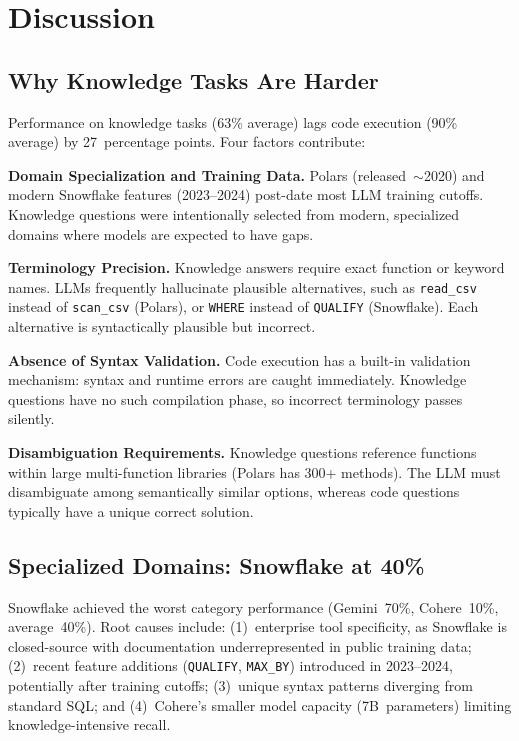\documentclass[conference]{IEEEtran}
\begin{document}
\section{Discussion}

\subsection{Why Knowledge Tasks Are Harder}

Performance on knowledge tasks (63\% average) lags code execution (90\% average) by 27~percentage points. Four factors contribute:

\textbf{Domain Specialization and Training Data.} Polars (released~$\sim$2020) and modern Snowflake features (2023--2024) post-date most LLM training cutoffs. Knowledge questions were intentionally selected from modern, specialized domains where models are expected to have gaps.

\textbf{Terminology Precision.} Knowledge answers require exact function or keyword names. LLMs frequently hallucinate plausible alternatives, such as \texttt{read\_csv} instead of \texttt{scan\_csv} (Polars), or \texttt{WHERE} instead of \texttt{QUALIFY} (Snowflake). Each alternative is syntactically plausible but incorrect.

\textbf{Absence of Syntax Validation.} Code execution has a built-in validation mechanism: syntax and runtime errors are caught immediately. Knowledge questions have no such compilation phase, so incorrect terminology passes silently.

\textbf{Disambiguation Requirements.} Knowledge questions reference functions within large multi-function libraries (Polars has 300+ methods). The LLM must disambiguate among semantically similar options, whereas code questions typically have a unique correct solution.

\subsection{Specialized Domains: Snowflake at 40\%}

Snowflake achieved the worst category performance (Gemini~70\%, Cohere~10\%, average~40\%). Root causes include: (1)~enterprise tool specificity, as Snowflake is closed-source with documentation underrepresented in public training data; (2)~recent feature additions (\texttt{QUALIFY}, \texttt{MAX\_BY}) introduced in 2023--2024, potentially after training cutoffs; (3)~unique syntax patterns diverging from standard SQL; and (4)~Cohere's smaller model capacity (7B~parameters) limiting knowledge-intensive recall.
\end{document}
